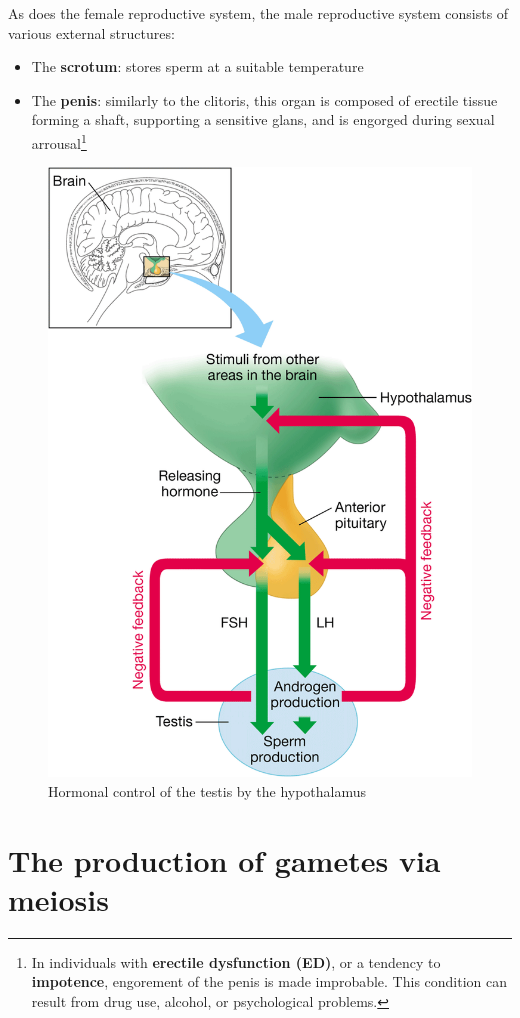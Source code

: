 \documentclass{article}
\begin{document}
As does the female reproductive system, the male reproductive system consists of
various external structures:

\begin{itemize}
	\item The \textbf{scrotum}: stores sperm at a suitable temperature
	\item The \textbf{penis}: similarly to the clitoris, this organ is composed
		of erectile tissue forming a shaft, supporting a sensitive glans, and
		is engorged during sexual arrousal\footnote{In individuals with
		\textbf{erectile dysfunction (ED)}, or a tendency to \textbf{impotence},
		engorement of the penis is made improbable. This condition can result from
		drug use, alcohol, or psychological problems.}
\end{itemize}

\begin{figure}[h]
	\centering
	\includegraphics[width=.4\linewidth]{hormonal_control.png}
	\caption{Hormonal control of the testis by the hypothalamus}
\end{figure}

\section{The production of gametes via meiosis}
\end{document}
